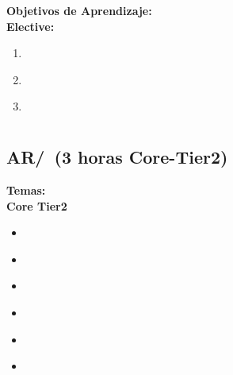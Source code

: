 \noindent \textbf{Objetivos de Aprendizaje:}\\
\noindent \textbf{Elective:}
\begin{enumerate}
	\setcounter{enumi}{0}
	\item \ALAdvancedDataStructuresAlgorithmsandAnalysisLOUnderstand\xspace[\ALAdvancedDataStructuresAlgorithmsandAnalysisLOUnderstandLevel]\label{sec:BOK:ALAdvancedDataStructuresAlgorithmsandAnalysisLOUnderstand}
	\item \ALAdvancedDataStructuresAlgorithmsandAnalysisLOSelect\xspace[\ALAdvancedDataStructuresAlgorithmsandAnalysisLOSelectLevel]\label{sec:BOK:ALAdvancedDataStructuresAlgorithmsandAnalysisLOSelect}
	\item \ALAdvancedDataStructuresAlgorithmsandAnalysisLOSelectAnd\xspace[\ALAdvancedDataStructuresAlgorithmsandAnalysisLOSelectAndLevel]\label{sec:BOK:ALAdvancedDataStructuresAlgorithmsandAnalysisLOSelectAnd}
\end{enumerate}




\section{\AR}\label{sec:BOK:AR}
\ARBOKDescription


\subsection{AR/\ARDigitallogicanddigitalsystems~(3 horas Core-Tier2)}\label{sec:BOK:ARDigitallogicanddigitalsystems}
\noindent \textbf{Temas:}\\
\noindent \textbf{Core Tier2}
\begin{itemize}
	\item \ARDigitallogicanddigitalsystemsTopicOverview\label{sec:BOK:ARDigitallogicanddigitalsystemsTopicOverview}
	\item \ARDigitallogicanddigitalsystemsTopicCombinational\label{sec:BOK:ARDigitallogicanddigitalsystemsTopicCombinational}
	\item \ARDigitallogicanddigitalsystemsTopicMultiple\label{sec:BOK:ARDigitallogicanddigitalsystemsTopicMultiple}
	\item \ARDigitallogicanddigitalsystemsTopicComputer\label{sec:BOK:ARDigitallogicanddigitalsystemsTopicComputer}
	\item \ARDigitallogicanddigitalsystemsTopicRegister\label{sec:BOK:ARDigitallogicanddigitalsystemsTopicRegister}
	\item \ARDigitallogicanddigitalsystemsTopicPhysical\label{sec:BOK:ARDigitallogicanddigitalsystemsTopicPhysical}
\end{itemize}


